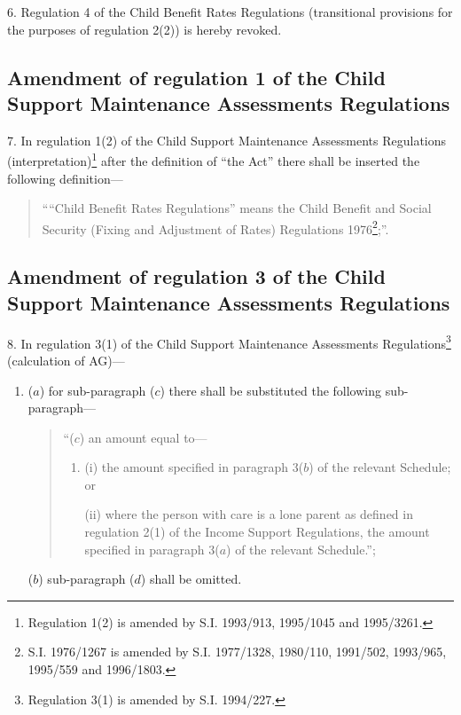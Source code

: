 \documentclass[12pt,a4paper]{article}
\begin{document}
6.  Regulation 4 of the Child Benefit Rates Regulations (transitional provisions for the purposes of regulation 2(2)) is hereby revoked.

\subsection[7. Amendment of regulation 1 of the Child Support Maintenance Assessments Regulations]{Amendment of regulation 1 of the Child Support Maintenance Assessments Regulations}

7.  In regulation 1(2) of the Child Support Maintenance Assessments Regulations (interpretation)\footnote{\frenchspacing Regulation 1(2) is amended by S.I. 1993/913, 1995/1045 and 1995/3261.} after the definition of “the Act” there shall be inserted the following definition—
\begin{quotation}
““Child Benefit Rates Regulations” means the Child Benefit and Social Security (Fixing and Adjustment of Rates) Regulations 1976\footnote{\frenchspacing S.I. 1976/1267 is amended by S.I. 1977/1328, 1980/110, 1991/502, 1993/965, 1995/559 and 1996/1803.};”.
\end{quotation}

\subsection[8. Amendment of regulation 3 of the Child Support Maintenance Assessments Regulations]{Amendment of regulation 3 of the Child Support Maintenance Assessments Regulations}

8.  In regulation 3(1) of the Child Support Maintenance Assessments Regulations\footnote{\frenchspacing Regulation 3(1) is amended by S.I. 1994/227.} (calculation of AG)—
\begin{enumerate}\item[]
($a$) for sub-paragraph ($c$) there shall be substituted the following sub-paragraph—
\begin{quotation}
“($c$) an amount equal to—
\begin{enumerate}\item[]
(i) the amount specified in paragraph 3($b$) of the relevant Schedule; or

(ii) where the person with care is a lone parent as defined in regulation 2(1) of the Income Support Regulations, the amount specified in paragraph 3($a$) of the relevant Schedule.”;
\end{enumerate}
\end{quotation}

($b$) sub-paragraph ($d$) shall be omitted.
\end{enumerate}
\end{document}
